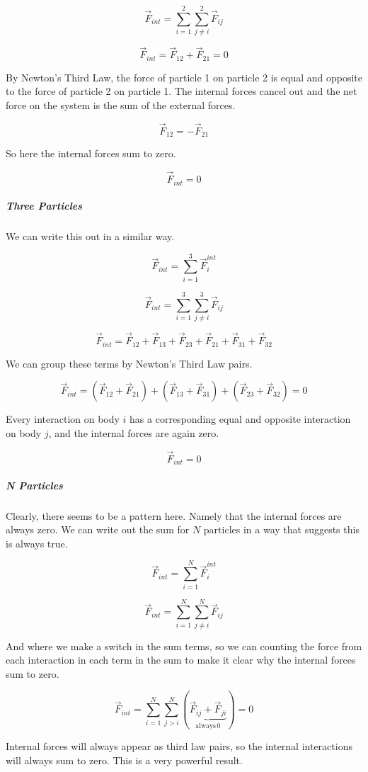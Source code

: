 \documentclass[11pt]{article}
\begin{document}
\[\vec{F}_{int} = \sum_{i=1}^2 \sum_{j\neq i}^{2} \vec{F}_{ij}\]

\[\vec{F}_{int} = \vec{F}_{12} + \vec{F}_{21} = 0\]

By Newton's Third Law, the force of particle 1 on particle 2 is equal
and opposite to the force of particle 2 on particle 1. The internal
forces cancel out and the net force on the system is the sum of the
external forces.

\[\vec{F}_{12} = -\vec{F}_{21}\]

So here the internal forces sum to zero.

\[\vec{F}_{int} = 0\]

\subparagraph{Three Particles}\label{three-particles}

We can write this out in a similar way.

\[\vec{F}_{int} = \sum_{i=1}^{3} \vec{F}_{i}^{int}\]

\[\vec{F}_{int} = \sum_{i=1}^3 \sum_{j\neq i}^{3} \vec{F}_{ij}\]

\[\vec{F}_{int} = \vec{F}_{12} + \vec{F}_{13} + \vec{F}_{23} + \vec{F}_{21} + \vec{F}_{31} + \vec{F}_{32}\]

We can group these terms by Newton's Third Law pairs.

\[\vec{F}_{int} = (\vec{F}_{12} + \vec{F}_{21}) + (\vec{F}_{13} + \vec{F}_{31}) + (\vec{F}_{23} + \vec{F}_{32}) = 0\]

Every interaction on body \(i\) has a corresponding equal and opposite
interaction on body \(j\), and the internal forces are again zero.

\[\vec{F}_{int} = 0\]

\subparagraph{N Particles}\label{n-particles}

Clearly, there seems to be a pattern here. Namely that the internal
forces are always zero. We can write out the sum for \(N\) particles in
a way that suggests this is always true.

\[\vec{F}_{int} = \sum_{i=1}^{N} \vec{F}_{i}^{int}\]

\[\vec{F}_{int} = \sum_{i=1}^N \sum_{j\neq i}^{N} \vec{F}_{ij}\]

And where we make a switch in the sum terms, so we can counting the
force from each interaction in each term in the sum to make it clear why
the internal forces sum to zero.

\[\vec{F}_{int} = \sum_{i=1}^N \sum_{j>i}^{N} \left(\underbrace{\vec{F}_{ij} + \vec{F}_{ji}}_{\mathrm{always}\,0}\right) = 0\]

Internal forces will always appear as third law pairs, so the internal
interactions will always sum to zero. This is a very powerful result.
\end{document}
